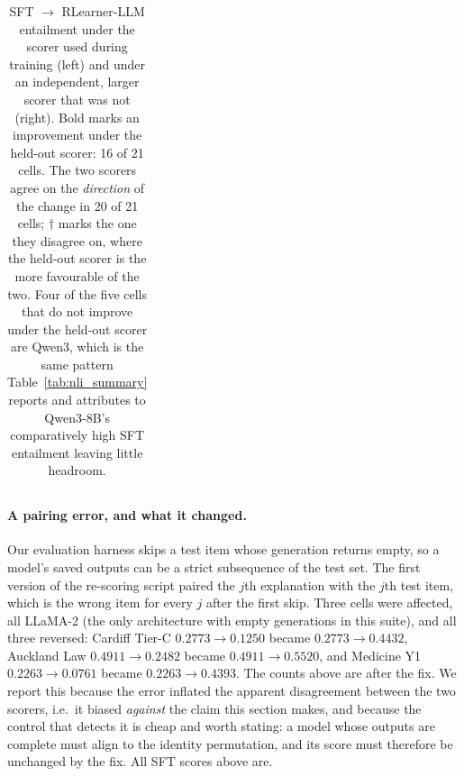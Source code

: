 \begin{table}[h]
{\begin{tabular}{lcc}
\bottomrule
\end{tabular}%
}
\caption{SFT $\to$ RLearner-LLM entailment under the scorer used during
training (left) and under an independent, larger scorer that was not
(right). Bold marks an improvement under the held-out scorer:
16 of 21 cells. The two scorers agree on the
\emph{direction} of the change in 20 of 21 cells; $\dagger$ marks the one
they disagree on, where the held-out scorer is the more favourable of the two.
Four of the five cells that do not improve under the held-out scorer are
Qwen3, which is the same pattern Table~\ref{tab:nli_summary} reports and
attributes to Qwen3-8B's comparatively high SFT entailment leaving little
headroom.}
\label{tab:heldout_nli}
\end{table}

\paragraph{A pairing error, and what it changed.} Our evaluation harness skips
a test item whose generation returns empty, so a model's saved outputs can be
a strict subsequence of the test set. The first version of the re-scoring
script paired the $j$th explanation with the $j$th test item, which is the
wrong item for every $j$ after the first skip. Three cells were affected, all
LLaMA-2 (the only architecture with empty generations in this suite), and all
three reversed: Cardiff Tier-C $0.2773 \to 0.1250$ became $0.2773 \to 0.4432$,
Auckland Law $0.4911 \to 0.2482$ became $0.4911 \to 0.5520$, and Medicine Y1
$0.2263 \to 0.0761$ became $0.2263 \to 0.4393$. The counts above are after the
fix. We report this because the error inflated the apparent disagreement
between the two scorers, i.e.\ it biased \emph{against} the claim this section
makes, and because the control that detects it is cheap and worth stating: a
model whose outputs are complete must align to the identity permutation, and
its score must therefore be unchanged by the fix. All SFT scores above are.
